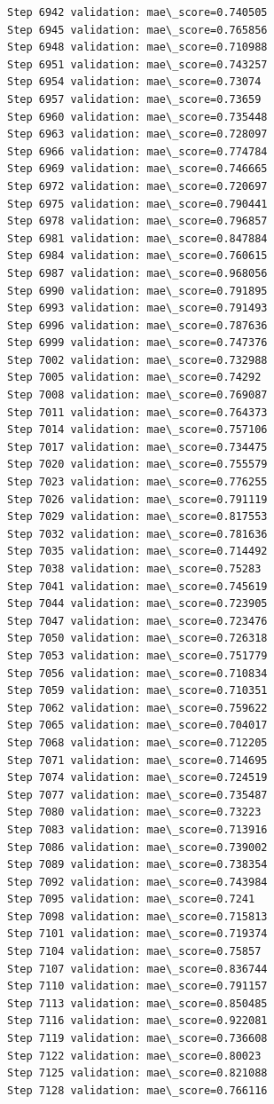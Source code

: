 \documentclass[11pt]{article}
\begin{document}
\begin{Verbatim}[commandchars=\\\{\}]
Step 6942 validation: mae\_score=0.740505
Step 6945 validation: mae\_score=0.765856
Step 6948 validation: mae\_score=0.710988
Step 6951 validation: mae\_score=0.743257
Step 6954 validation: mae\_score=0.73074
Step 6957 validation: mae\_score=0.73659
Step 6960 validation: mae\_score=0.735448
Step 6963 validation: mae\_score=0.728097
Step 6966 validation: mae\_score=0.774784
Step 6969 validation: mae\_score=0.746665
Step 6972 validation: mae\_score=0.720697
Step 6975 validation: mae\_score=0.790441
Step 6978 validation: mae\_score=0.796857
Step 6981 validation: mae\_score=0.847884
Step 6984 validation: mae\_score=0.760615
Step 6987 validation: mae\_score=0.968056
Step 6990 validation: mae\_score=0.791895
Step 6993 validation: mae\_score=0.791493
Step 6996 validation: mae\_score=0.787636
Step 6999 validation: mae\_score=0.747376
Step 7002 validation: mae\_score=0.732988
Step 7005 validation: mae\_score=0.74292
Step 7008 validation: mae\_score=0.769087
Step 7011 validation: mae\_score=0.764373
Step 7014 validation: mae\_score=0.757106
Step 7017 validation: mae\_score=0.734475
Step 7020 validation: mae\_score=0.755579
Step 7023 validation: mae\_score=0.776255
Step 7026 validation: mae\_score=0.791119
Step 7029 validation: mae\_score=0.817553
Step 7032 validation: mae\_score=0.781636
Step 7035 validation: mae\_score=0.714492
Step 7038 validation: mae\_score=0.75283
Step 7041 validation: mae\_score=0.745619
Step 7044 validation: mae\_score=0.723905
Step 7047 validation: mae\_score=0.723476
Step 7050 validation: mae\_score=0.726318
Step 7053 validation: mae\_score=0.751779
Step 7056 validation: mae\_score=0.710834
Step 7059 validation: mae\_score=0.710351
Step 7062 validation: mae\_score=0.759622
Step 7065 validation: mae\_score=0.704017
Step 7068 validation: mae\_score=0.712205
Step 7071 validation: mae\_score=0.714695
Step 7074 validation: mae\_score=0.724519
Step 7077 validation: mae\_score=0.735487
Step 7080 validation: mae\_score=0.73223
Step 7083 validation: mae\_score=0.713916
Step 7086 validation: mae\_score=0.739002
Step 7089 validation: mae\_score=0.738354
Step 7092 validation: mae\_score=0.743984
Step 7095 validation: mae\_score=0.7241
Step 7098 validation: mae\_score=0.715813
Step 7101 validation: mae\_score=0.719374
Step 7104 validation: mae\_score=0.75857
Step 7107 validation: mae\_score=0.836744
Step 7110 validation: mae\_score=0.791157
Step 7113 validation: mae\_score=0.850485
Step 7116 validation: mae\_score=0.922081
Step 7119 validation: mae\_score=0.736608
Step 7122 validation: mae\_score=0.80023
Step 7125 validation: mae\_score=0.821088
Step 7128 validation: mae\_score=0.766116

\end{Verbatim}
\end{document}
